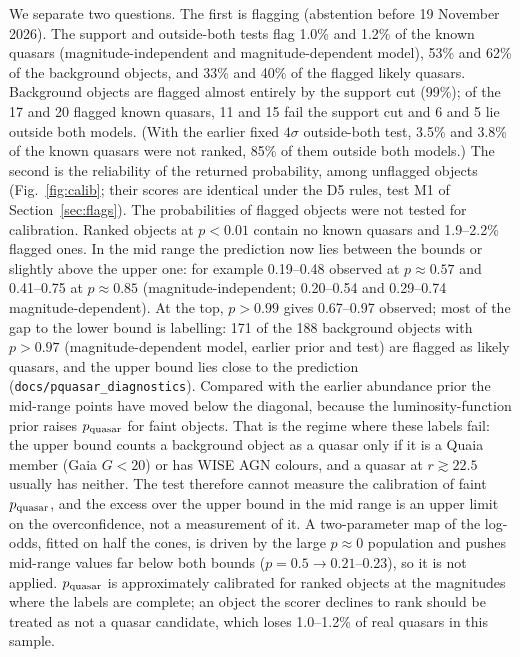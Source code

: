 \documentclass[11pt,a4paper]{article}
\newcommand{\code}[1]{\texttt{#1}}
\begin{document}
We separate two questions. The first is flagging (abstention before 19 November 2026). The support and
outside-both tests flag 1.0\% and 1.2\% of the known quasars (magnitude-independent and magnitude-dependent model),
53\% and 62\% of the background objects, and 33\% and 40\% of the flagged likely quasars. Background objects are
flagged almost entirely by the support cut (99\%); of the 17 and 20 flagged known quasars, 11 and 15 fail the
support cut and 6 and 5 lie outside both models. (With the earlier fixed $4\sigma$ outside-both test, 3.5\% and 3.8\% of the known quasars
were not ranked, 85\% of them outside both models.)
The second is the reliability of the returned probability, among unflagged objects (Fig.~\ref{fig:calib}; their
scores are identical under the D5 rules, test M1 of Section~\ref{sec:flags}). The probabilities of flagged objects
were not tested for calibration.
Ranked objects at $p<0.01$ contain no known quasars and 1.9--2.2\% flagged ones. In the mid range the prediction
now lies between the bounds or slightly above the upper one: for example 0.19--0.48 observed at $p\approx0.57$ and
0.41--0.75 at $p\approx0.85$ (magnitude-independent; 0.20--0.54 and 0.29--0.74 magnitude-dependent). At the top,
$p>0.99$ gives 0.67--0.97 observed; most of the gap to the lower bound is labelling: 171 of the 188 background
objects with $p>0.97$ (magnitude-dependent model, earlier prior and test) are flagged as likely quasars, and the
upper bound lies close to the prediction (\code{docs/pquasar\_diagnostics}). Compared with the earlier abundance prior
the mid-range points have moved below the diagonal, because the luminosity-function prior raises $p_{\rm quasar}$ for
faint objects. That is the regime where these labels fail: the upper bound counts a background object as a quasar
only if it is a Quaia member (Gaia $G<20$) or has WISE AGN colours, and a quasar at $r\gtrsim22.5$ usually has
neither. The test therefore cannot measure the calibration of faint $p_{\rm quasar}$, and the excess over the upper
bound in the mid range is an upper limit on the overconfidence, not a measurement of it. A two-parameter map of the
log-odds, fitted on half the cones, is driven by the large $p\approx0$ population and pushes mid-range values far below
both bounds ($p=0.5\to0.21$--0.23), so it is not applied. $p_{\rm quasar}$ is approximately calibrated for ranked
objects at the magnitudes where the labels are complete; an object the scorer declines to rank should be treated as
not a quasar candidate, which loses 1.0--1.2\% of real quasars in this sample.
\end{document}
